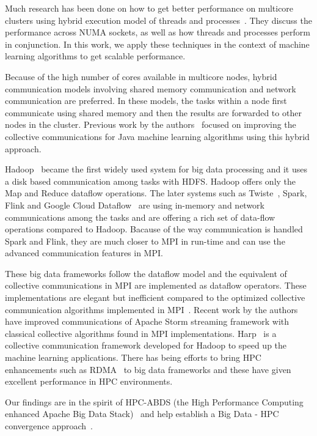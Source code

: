 \documentclass[10pt, conference, compsocconf]{IEEEtran}
\begin{document}
Much research has been done on how to get better performance on multicore clusters using hybrid execution model of threads and processes~\cite{chorley2010performance, rabenseifner2009hybrid, camp2011streamline}. They discuss the performance across NUMA sockets, as well as how threads and processes perform in conjunction. In this work, we apply these techniques in the context of machine learning algorithms to get scalable performance.

Because of the high number of cores available in multicore nodes, hybrid communication models involving shared memory communication and network communication are preferred. In these models, the tasks within a node first communicate using shared memory and then the results are forwarded to other nodes in the cluster. Previous work by the authors~\cite{hpc2016:spidaljava} focused on improving the collective communications for Java machine learning algorithms using this hybrid approach. 

Hadoop~\cite{lam2010hadoop} became the first widely used system for big data processing and it uses a disk based communication among tasks with HDFS. Hadoop offers only the Map and Reduce  dataflow operations. The later systems such as Twiste~\cite{Ekanayake:2010:TRI:1851476.1851593}, Spark, Flink and Google Cloud Dataflow~\cite{akidau2015dataflow} are using in-memory and network communications among the tasks and are offering a rich set of data-flow operations compared to Hadoop. Bacause of the way communication is handled Spark and Flink, they are much closer to \ac{MPI} in run-time and can use the advanced communication features in MPI. 

These big data frameworks follow the  dataflow model and the equivalent of collective communications in \ac{MPI} are implemented as  dataflow operators. These implementations are elegant but inefficient compared to the optimized collective communication algorithms implemented in MPI~\cite{pjevsivac2007performance, thakur2005optimization}. Recent work by the authors~\cite{kamburugamuve2016towards} have improved communications of Apache Storm streaming framework with classical collective algorithms found in \ac{MPI} implementations. Harp~\cite{zhang2015harp} is a collective communication framework developed for Hadoop to speed up the machine learning applications. There has being efforts to bring HPC enhancements such as RDMA~\cite{lu2013high} to big data frameworks and these have given excellent performance in HPC environments.

Our findings are in the spirit of HPC-ABDS (the High Performance Computing enhanced Apache Big Data Stack)~\cite{kaleidoescope} and help establish a Big Data - HPC convergence approach~\cite{fox1858big}.
\end{document}
